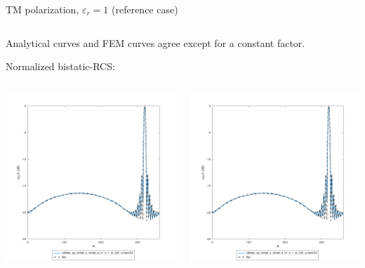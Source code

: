 \begin{frame}{TM polarization, $\varepsilon_r=1$ (reference case)}
\begin{columns}
\end{columns}

\vbs

Analytical curves and FEM curves agree except for a constant factor. 

Normalized bistatic-RCS:

\vbss

\begin{columns}

\includegraphics[width=\linewidth]{results/FF/cylD_01_H_1_M_025_X/iiee_norm.png}


\includegraphics[width=\linewidth]{results/FF/cylD_01_H_1_M_025_Y/iiee_norm.png}


\end{columns}
\end{frame}
